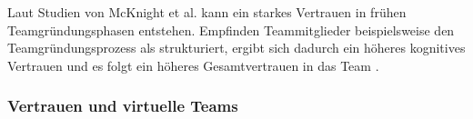\documentclass[a4paper,11pt]{article}%
\renewcommand{\\}{\vspace*{0.5\baselineskip} \newline}
\begin{document}
Laut Studien von McKnight et al. kann ein starkes Vertrauen in frühen Teamgründungsphasen entstehen. Empfinden Teammitglieder beispielsweise den Teamgründungsprozess als strukturiert, ergibt sich dadurch ein höheres kognitives Vertrauen und es folgt ein höheres Gesamtvertrauen in das Team \citep[S.478-479]{mcknight1998initial}.



%
	\subsubsection{Vertrauen und virtuelle Teams}
	\label{Vertrauen und virtuelle Teams}
	
\end{document}
